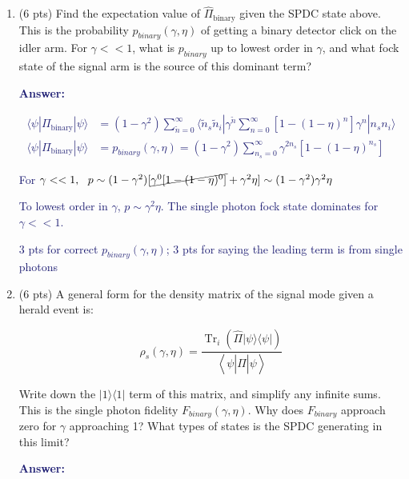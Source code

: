\documentclass[11pt]{caltech_thesis} %
\begin{document}
\begin{enumerate}
\def\labelenumi{\arabic{enumi}.}
\item
  (6 pts) Find the expectation value of $\hat{\Pi}_{\text {binary}}$
  given the SPDC state above. This is the probability
  $p_{binary}\left(\gamma, \eta\right)$ of getting a binary detector
  click on the idler arm. For $\gamma << 1$, what is $p_{binary}$ up to
  lowest order in $\gamma$, and what fock state of the signal arm is the
  source of this dominant term?

  \textcolor{midnightblue}{ \textbf{Answer:} }

  \textcolor{midnightblue}{

  $$\begin{aligned}
   \langle \psi | \Pi_{\text {binary}} | \psi \rangle &= (1- \gamma^2) \sum_{\tilde{n}=0}^{\infty} \langle \tilde{n}_s \tilde{n}_i | \gamma^{\tilde{n}} \sum_{n=0}^{\infty}[1 - (1-\eta)^{n}] \gamma^n | n_s n_i \rangle \\
   \langle \psi | \Pi_{\text {binary}} | \psi \rangle &= p_{binary}(\gamma, \eta) =  \boxed{(1-\gamma^2) \sum_{n_s=0}^{\infty} \gamma^{2n_s} [1 - (1 - \eta)^{n_s}]}
   \end{aligned}$$

  }

  \textcolor{midnightblue}{For
  $\gamma << 1, ~~ p \sim (1 - \gamma^2)[\cancel{\gamma^0[1 - (1 - \eta)^0]} + \gamma^{2}\eta ] \sim (1 - \gamma^2)\gamma^{2}\eta$
  }

  \textcolor{midnightblue}{ To lowest order in $\gamma$,
  $p \sim \gamma^{2}\eta$. The single photon fock state dominates for
  $\gamma << 1$. }

  \textcolor{midnightblue}{ 3 pts for correct
  $p_{binary}(\gamma, \eta)$; 3 pts for saying the leading term is from
  single photons }
\item
  (6 pts) A general form for the density matrix of the signal mode given
  a herald event is:

  $$\rho_{s}\left(\gamma, \eta\right)=\frac{\operatorname{Tr}_{i}\left(\hat{\Pi}|\psi\rangle\langle\psi|\right)}{\left\langle\psi\left|\hat{\Pi}\right| \psi\right\rangle}$$

  Write down the $|1\rangle\langle1|$ term of this matrix, and simplify
  any infinite sums. This is the single photon fidelity
  $F_{binary}(\gamma, \eta)$. Why does $F_{binary}$ approach zero for
  $\gamma$ approaching 1? What types of states is the SPDC generating in
  this limit?

  \textcolor{midnightblue}{ \textbf{Answer:} }


\end{enumerate}
\end{document}
